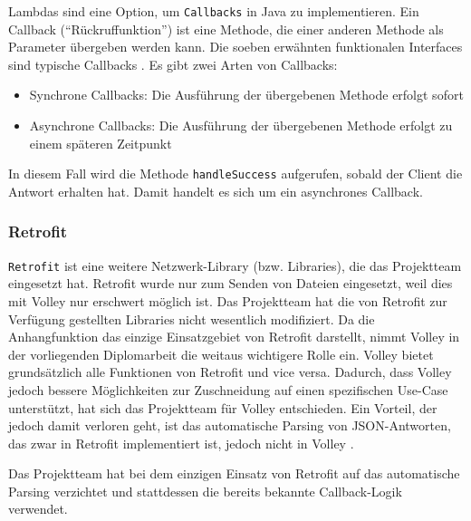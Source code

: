 Lambdas sind eine Option, um \texttt{Callbacks} in Java zu
implementieren. Ein Callback (``Rückruffunktion'') ist eine Methode, die
einer anderen Methode als Parameter übergeben werden kann. Die soeben
erwähnten funktionalen Interfaces sind typische Callbacks
\cite{Callbacks}. Es gibt zwei Arten von Callbacks:

\begin{itemize}
\tightlist
\item
  Synchrone Callbacks: Die Ausführung der übergebenen Methode erfolgt
  sofort
\item
  Asynchrone Callbacks: Die Ausführung der übergebenen Methode erfolgt
  zu einem späteren Zeitpunkt
\end{itemize}

In diesem Fall wird die Methode \texttt{handleSuccess} aufgerufen,
sobald der Client die Antwort erhalten hat. Damit handelt es sich um ein
asynchrones Callback.

\hypertarget{retrofit}{%
\subsubsection{Retrofit}\label{retrofit}}

\texttt{Retrofit} ist eine weitere Netzwerk-Library (bzw. Libraries),
die das Projektteam eingesetzt hat. Retrofit wurde nur zum Senden von
Dateien eingesetzt, weil dies mit Volley nur erschwert möglich ist. Das
Projektteam hat die von Retrofit zur Verfügung gestellten Libraries
nicht wesentlich modifiziert. Da die Anhangfunktion das einzige
Einsatzgebiet von Retrofit darstellt, nimmt Volley in der vorliegenden
Diplomarbeit die weitaus wichtigere Rolle ein. Volley bietet
grundsätzlich alle Funktionen von Retrofit und vice versa. Dadurch, dass
Volley jedoch bessere Möglichkeiten zur Zuschneidung auf einen
spezifischen Use-Case unterstützt, hat sich das Projektteam für Volley
entschieden. Ein Vorteil, der jedoch damit verloren geht, ist das
automatische Parsing von JSON-Antworten, das zwar in Retrofit
implementiert ist, jedoch nicht in Volley \cite{retrofit-vs-volley}.

Das Projektteam hat bei dem einzigen Einsatz von Retrofit auf das
automatische Parsing verzichtet und stattdessen die bereits bekannte
Callback-Logik verwendet.

